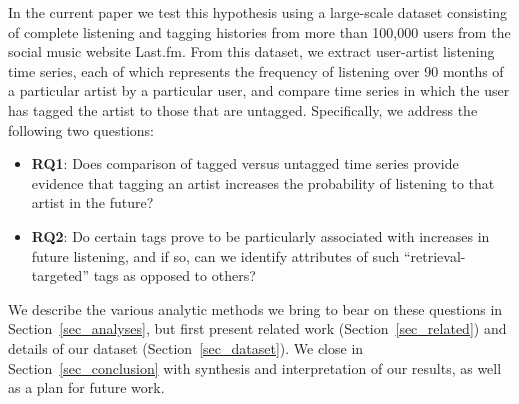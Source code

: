 In the current paper we test this hypothesis using a large-scale dataset consisting of complete listening and tagging histories from more than 100,000 users from the social music website Last.fm. From this dataset, we extract user-artist listening time series, each of which represents the frequency of listening over 90 months of a particular artist by a particular user, and compare time series in which the user has tagged the artist to those that are untagged. Specifically, we address the following two questions:
\begin{itemize}
	\item {\bf RQ1}: Does comparison of tagged versus untagged time series provide evidence that tagging an artist increases the probability of listening to that artist in the future?
	\item {\bf RQ2}: Do certain tags prove to be particularly associated with increases in future listening, and if so, can we identify attributes of such ``retrieval-targeted'' tags as opposed to others?
\end{itemize}

We describe the various analytic methods we bring to bear on these questions in Section~\ref{sec_analyses}, but first present related work (Section~\ref{sec_related}) and details of our dataset (Section~\ref{sec_dataset}). We close in Section~\ref{sec_conclusion} with synthesis and interpretation of our results, as well as a plan for future work.